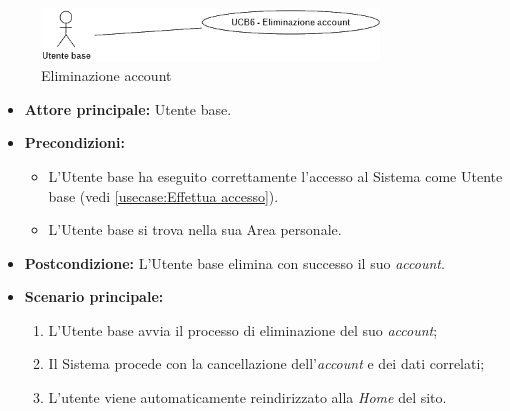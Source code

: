 \newpage
{}
\label{usecase:Eliminazione account}

\begin{figure}[h]
	\centering
	\includegraphics[width=0.8\textwidth]{./uml/UCB6.png} 
	\caption{Eliminazione account}
	\label{fig:UCB7}
  \end{figure}

\begin{itemize}
	\item \textbf{Attore principale:} Utente base.

	\item \textbf{Precondizioni:}
	      \begin{itemize}
		      \item L'Utente base ha eseguito correttamente l'accesso al Sistema come Utente base (vedi \autoref{usecase:Effettua accesso}).
		      \item L'Utente base si trova nella sua Area personale.
	      \end{itemize}

	\item \textbf{Postcondizione:} L'Utente base elimina con successo il suo \textit{account}.

	\item \textbf{Scenario principale:}
	      \begin{enumerate}
		      \item L'Utente base avvia il processo di eliminazione del suo \textit{account};
		      \item Il Sistema procede con la cancellazione dell'\textit{account} e dei dati correlati;
		      \item L'utente viene automaticamente reindirizzato alla \textit{Home} del sito.
	      \end{enumerate}
\end{itemize}
